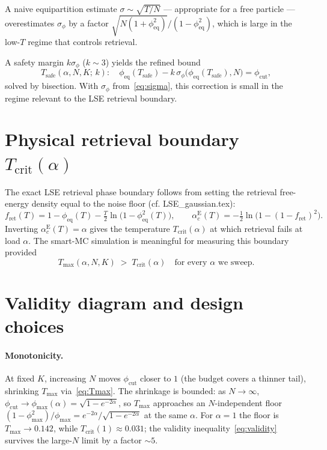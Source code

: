 \documentclass[11pt]{article}
\newcommand{\Pcut}{\phi_{\mathrm{cut}}}
\newcommand{\Pmax}{\phi_{\max}}
\newcommand{\Peq}{\phi_{\mathrm{eq}}}
\newcommand{\Tcrit}{T_{\mathrm{crit}}}
\newcommand{\Tmax}{T_{\mathrm{max}}}
\newcommand{\Tsafe}{T_{\mathrm{safe}}}
\begin{document}
A naive equipartition estimate $\sigma \sim \sqrt{T/N}$ — appropriate for a free particle — overestimates $\sigma_\phi$ by a factor $\sqrt{N(1+\Peq^2)}/(1-\Peq^2)$, which is large in the low-$T$ regime that controls retrieval.

A safety margin $k\sigma_\phi$ ($k\!\sim\!3$) yields the refined bound
\begin{equation}
\Tsafe(\alpha,N,K;\,k):\quad \Peq(\Tsafe) - k\,\sigma_\phi\big(\Peq(\Tsafe),N\big) = \Pcut,
\label{eq:Tsafe}
\end{equation}
solved by bisection. With $\sigma_\phi$ from~\eqref{eq:sigma}, this correction is small in the regime relevant to the LSE retrieval boundary.

\section{Physical retrieval boundary $\Tcrit(\alpha)$}

The exact LSE retrieval phase boundary follows from setting the retrieval free-energy density equal to the noise floor (cf. LSE\_gaussian.tex):
\begin{equation}
f_{\mathrm{ret}}(T) = 1 - \Peq(T) - \tfrac{T}{2}\ln\!\big(1-\Peq^2(T)\big),\qquad
\alpha_c^{\mathrm E}(T) = -\tfrac{1}{2}\ln\!\big(1-(1-f_{\mathrm{ret}})^2\big).
\end{equation}
Inverting $\alpha_c^{\mathrm E}(T) = \alpha$ gives the temperature $\Tcrit(\alpha)$ at which retrieval fails at load $\alpha$. The smart-MC simulation is meaningful for measuring this boundary provided
\begin{equation}
\boxed{\;\Tmax(\alpha,N,K) \;>\; \Tcrit(\alpha)\quad\text{for every }\alpha\text{ we sweep}.\;}
\label{eq:validity}
\end{equation}

\section{Validity diagram and design choices}

\paragraph{Monotonicity.} At fixed $K$, increasing $N$ moves $\Pcut$ closer to $1$ (the budget covers a thinner tail), shrinking $\Tmax$ via~\eqref{eq:Tmax}. The shrinkage is bounded: as $N\to\infty$, $\Pcut\to\Pmax(\alpha)= \sqrt{1-e^{-2\alpha}}$, so $\Tmax$ approaches an $N$-independent floor $(1-\Pmax^2)/\Pmax = e^{-2\alpha}/\sqrt{1-e^{-2\alpha}}$ at the same $\alpha$. For $\alpha\!=\!1$ the floor is $\Tmax \to 0.142$, while $\Tcrit(1)\approx 0.031$; the validity inequality~\eqref{eq:validity} survives the large-$N$ limit by a factor $\sim 5$.
\end{document}
